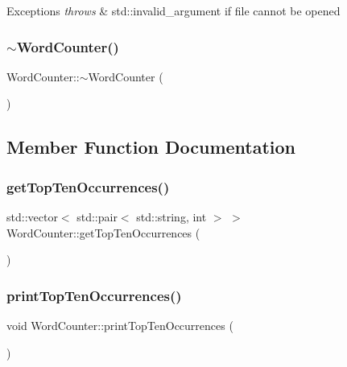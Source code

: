 \begin{DoxyExceptions}{Exceptions}
{\em throws} & std\+::invalid\+\_\+argument if file cannot be opened \\
\hline
\end{DoxyExceptions}
\mbox{\label{class_word_counter_ad0703060b084d90e36bb7b506c7eff94}} 
\subsubsection{\texorpdfstring{$\sim$\+Word\+Counter()}{~WordCounter()}}
{\footnotesize\ttfamily Word\+Counter\+::$\sim$\+Word\+Counter (\begin{DoxyParamCaption}{ }\end{DoxyParamCaption})}



\subsection{Member Function Documentation}
\mbox{\label{class_word_counter_ab1c63e4767c0ac7d4c884f0ed78cac26}} 
\subsubsection{\texorpdfstring{get\+Top\+Ten\+Occurrences()}{getTopTenOccurrences()}}
{\footnotesize\ttfamily std\+::vector$<$ std\+::pair$<$ std\+::string, int $>$ $>$ Word\+Counter\+::get\+Top\+Ten\+Occurrences (\begin{DoxyParamCaption}{ }\end{DoxyParamCaption})}

\mbox{\label{class_word_counter_a29d681756dec9d102141c6c8a136561d}} 
\subsubsection{\texorpdfstring{print\+Top\+Ten\+Occurrences()}{printTopTenOccurrences()}}
{\footnotesize\ttfamily void Word\+Counter\+::print\+Top\+Ten\+Occurrences (\begin{DoxyParamCaption}{ }\end{DoxyParamCaption})}



